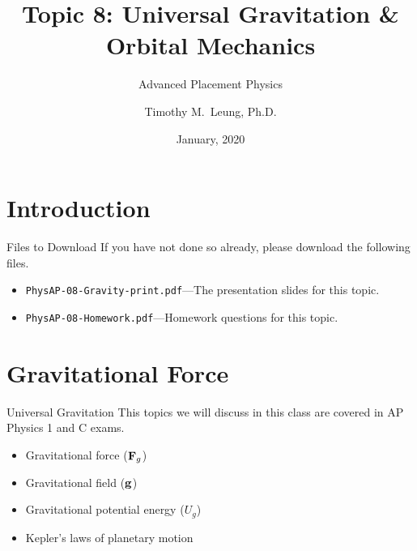 \documentclass[12pt,compress,aspectratio=169]{beamer}
\title{Topic 8: Universal Gravitation \& Orbital Mechanics}
\subtitle{Advanced Placement Physics}
\author{Timothy M.\ Leung, Ph.D.}
\institute{Olympiads School\\Toronto, Ontario, Canada}
\date{January, 2020}
\newcommand{\mb}[1]{\ensuremath\mathbf{#1}}
\begin{document}
\begin{frame}
  \maketitle
\end{frame}


\section[Intro]{Introduction}

\begin{frame}{Files to Download}
  If you have not done so already, please download the following files.
  \begin{itemize}
  \item\texttt{PhysAP-08-Gravity-print.pdf}---The presentation slides for this
    topic.
  \item\texttt{PhysAP-08-Homework.pdf}---Homework questions for this topic.
  \end{itemize}
\end{frame}



\section{Gravitational Force}

\begin{frame}{Universal Gravitation}
  This topics we will discuss in this class are covered in AP Physics 1 and
  C exams.
  \begin{itemize}
  \item Gravitational force ($\mb{F}_g$)
  \item Gravitational field ($\mb{g}$)
  \item Gravitational potential energy  ($U_g$)
  \item Kepler's laws of planetary motion
  \end{itemize}
\end{frame}
\end{document}
